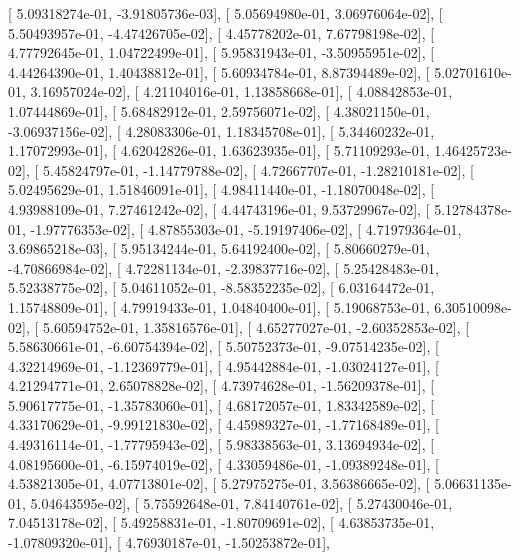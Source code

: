 \documentclass{article}
\begin{document}
       [  5.09318274e-01,  -3.91805736e-03],
       [  5.05694980e-01,   3.06976064e-02],
       [  5.50493957e-01,  -4.47426705e-02],
       [  4.45778202e-01,   7.67798198e-02],
       [  4.77792645e-01,   1.04722499e-01],
       [  5.95831943e-01,  -3.50955951e-02],
       [  4.44264390e-01,   1.40438812e-01],
       [  5.60934784e-01,   8.87394489e-02],
       [  5.02701610e-01,   3.16957024e-02],
       [  4.21104016e-01,   1.13858668e-01],
       [  4.08842853e-01,   1.07444869e-01],
       [  5.68482912e-01,   2.59756071e-02],
       [  4.38021150e-01,  -3.06937156e-02],
       [  4.28083306e-01,   1.18345708e-01],
       [  5.34460232e-01,   1.17072993e-01],
       [  4.62042826e-01,   1.63623935e-01],
       [  5.71109293e-01,   1.46425723e-02],
       [  5.45824797e-01,  -1.14779788e-02],
       [  4.72667707e-01,  -1.28210181e-02],
       [  5.02495629e-01,   1.51846091e-01],
       [  4.98411440e-01,  -1.18070048e-02],
       [  4.93988109e-01,   7.27461242e-02],
       [  4.44743196e-01,   9.53729967e-02],
       [  5.12784378e-01,  -1.97776353e-02],
       [  4.87855303e-01,  -5.19197406e-02],
       [  4.71979364e-01,   3.69865218e-03],
       [  5.95134244e-01,   5.64192400e-02],
       [  5.80660279e-01,  -4.70866984e-02],
       [  4.72281134e-01,  -2.39837716e-02],
       [  5.25428483e-01,   5.52338775e-02],
       [  5.04611052e-01,  -8.58352235e-02],
       [  6.03164472e-01,   1.15748809e-01],
       [  4.79919433e-01,   1.04840400e-01],
       [  5.19068753e-01,   6.30510098e-02],
       [  5.60594752e-01,   1.35816576e-01],
       [  4.65277027e-01,  -2.60352853e-02],
       [  5.58630661e-01,  -6.60754394e-02],
       [  5.50752373e-01,  -9.07514235e-02],
       [  4.32214969e-01,  -1.12369779e-01],
       [  4.95442884e-01,  -1.03024127e-01],
       [  4.21294771e-01,   2.65078828e-02],
       [  4.73974628e-01,  -1.56209378e-01],
       [  5.90617775e-01,  -1.35783060e-01],
       [  4.68172057e-01,   1.83342589e-02],
       [  4.33170629e-01,  -9.99121830e-02],
       [  4.45989327e-01,  -1.77168489e-01],
       [  4.49316114e-01,  -1.77795943e-02],
       [  5.98338563e-01,   3.13694934e-02],
       [  4.08195600e-01,  -6.15974019e-02],
       [  4.33059486e-01,  -1.09389248e-01],
       [  4.53821305e-01,   4.07713801e-02],
       [  5.27975275e-01,   3.56386665e-02],
       [  5.06631135e-01,   5.04643595e-02],
       [  5.75592648e-01,   7.84140761e-02],
       [  5.27430046e-01,   7.04513178e-02],
       [  5.49258831e-01,  -1.80709691e-02],
       [  4.63853735e-01,  -1.07809320e-01],
       [  4.76930187e-01,  -1.50253872e-01],
\end{document}
